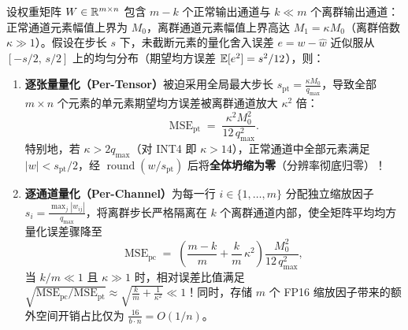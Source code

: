 \begin{thmBox}
\begin{theorem}[重尾离群通道对逐张量量化的破坏效应与逐通道误差隔离]
\label{thm:quant-outlier-error}
设权重矩阵 $W \in \mathbb{R}^{m \times n}$ 包含 $m - k$ 个正常输出通道与 $k \ll m$ 个离群输出通道：正常通道元素幅值上界为 $M_0$，离群通道元素幅值上界高达 $M_1 = \kappa M_0$（离群倍数 $\kappa \gg 1$）。假设在步长 $s$ 下，未截断元素的量化舍入误差 $e = w - \hat{w}$ 近似服从 $[-s/2,\, s/2]$ 上的均匀分布（期望均方误差 $\mathbb{E}[e^2] = s^2 / 12$），则：
\begin{enumerate}
  \item \textbf{逐张量量化（Per-Tensor）}被迫采用全局最大步长 $s_{\mathrm{pt}} = \frac{\kappa M_0}{q_{\max}}$，导致全部 $m \times n$ 个元素的单元素期望均方误差被离群通道放大 $\kappa^2$ 倍：
  \begin{equation}
    \mathrm{MSE}_{\mathrm{pt}} \;=\; \frac{\kappa^2 M_0^2}{12\, q_{\max}^2}.
    \label{eq:mse-pt}
  \end{equation}
  特别地，若 $\kappa > 2 q_{\max}$（对 INT4 即 $\kappa > 14$），正常通道中全部元素满足 $|w| < s_{\mathrm{pt}}/2$，经 $\operatorname{round}(w / s_{\mathrm{pt}})$ 后将\textbf{全体坍缩为零}（分辨率彻底归零）！
  \item \textbf{逐通道量化（Per-Channel）}为每一行 $i \in \{1, \dots, m\}$ 分配独立缩放因子 $s_i = \frac{\max_j |w_{ij}|}{q_{\max}}$，将离群步长严格隔离在 $k$ 个离群通道内部，使全矩阵平均均方量化误差骤降至
  \begin{equation}
    \mathrm{MSE}_{\mathrm{pc}} \;=\; \left(\frac{m - k}{m} + \frac{k}{m}\,\kappa^2\right) \frac{M_0^2}{12\, q_{\max}^2},
    \label{eq:mse-pc}
  \end{equation}
  当 $k / m \ll 1$ 且 $\kappa \gg 1$ 时，相对误差比值满足 $\sqrt{\mathrm{MSE}_{\mathrm{pc}} / \mathrm{MSE}_{\mathrm{pt}}} \approx \sqrt{\frac{k}{m} + \frac{1}{\kappa^2}} \ll 1$！同时，存储 $m$ 个 FP16 缩放因子带来的额外空间开销占比仅为 $\frac{16}{b \cdot n} = O(1/n)$。
\end{enumerate}
\end{theorem}
\end{thmBox}

